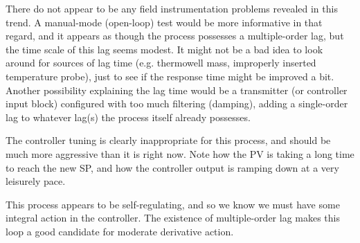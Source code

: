 \vskip 10pt

There do not appear to be any field instrumentation problems revealed in this trend.  A manual-mode (open-loop) test would be more informative in that regard, and it appears as though the process possesses a multiple-order lag, but the time scale of this lag seems modest.  It might not be a bad idea to look around for sources of lag time (e.g. thermowell mass, improperly inserted temperature probe), just to see if the response time might be improved a bit.  Another possibility explaining the lag time would be a transmitter (or controller input block) configured with too much filtering (damping), adding a single-order lag to whatever lag(s) the process itself already possesses.

\vskip 10pt
  
The controller tuning is clearly inappropriate for this process, and should be much more aggressive than it is right now.  Note how the PV is taking a long time to reach the new SP, and how the controller output is ramping down at a very leisurely pace.

\vskip 10pt

This process appears to be self-regulating, and so we know we must have some integral action in the controller.  The existence of multiple-order lag makes this loop a good candidate for moderate derivative action.











